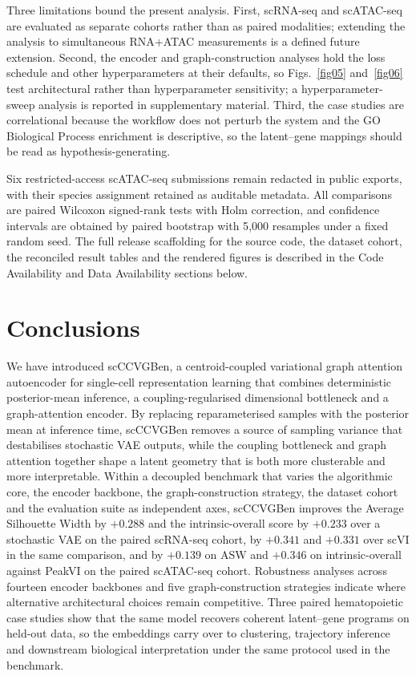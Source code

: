 \documentclass[referee, pdflatex, sn-vancouver-num]{sn-jnl}
\begin{document}
Three limitations bound the present analysis. First, scRNA-seq and scATAC-seq are evaluated as separate cohorts rather than as paired modalities; extending the analysis to simultaneous RNA+ATAC measurements is a defined future extension. Second, the encoder and graph-construction analyses hold the loss schedule and other hyperparameters at their defaults, so Figs.~\ref{fig05} and~\ref{fig06} test architectural rather than hyperparameter sensitivity; a hyperparameter-sweep analysis is reported in supplementary material. Third, the case studies are correlational because the workflow does not perturb the system and the GO Biological Process enrichment is descriptive, so the latent--gene mappings should be read as hypothesis-generating.

Six restricted-access scATAC-seq submissions remain redacted in public exports, with their species assignment retained as auditable metadata. All comparisons are paired Wilcoxon signed-rank tests with Holm correction, and confidence intervals are obtained by paired bootstrap with 5{,}000 resamples under a fixed random seed. The full release scaffolding for the source code, the dataset cohort, the reconciled result tables and the rendered figures is described in the Code Availability and Data Availability sections below.

\section{Conclusions}

We have introduced scCCVGBen, a centroid-coupled variational graph attention autoencoder for single-cell representation learning that combines deterministic posterior-mean inference, a coupling-regularised dimensional bottleneck and a graph-attention encoder. By replacing reparameterised samples with the posterior mean at inference time, scCCVGBen removes a source of sampling variance that destabilises stochastic VAE outputs, while the coupling bottleneck and graph attention together shape a latent geometry that is both more clusterable and more interpretable. Within a decoupled benchmark that varies the algorithmic core, the encoder backbone, the graph-construction strategy, the dataset cohort and the evaluation suite as independent axes, scCCVGBen improves the Average Silhouette Width by $+0.288$ and the intrinsic-overall score by $+0.233$ over a stochastic VAE on the paired scRNA-seq cohort, by $+0.341$ and $+0.331$ over scVI in the same comparison, and by $+0.139$ on ASW and $+0.346$ on intrinsic-overall against PeakVI on the paired scATAC-seq cohort. Robustness analyses across fourteen encoder backbones and five graph-construction strategies indicate where alternative architectural choices remain competitive. Three paired hematopoietic case studies show that the same model recovers coherent latent--gene programs on held-out data, so the embeddings carry over to clustering, trajectory inference and downstream biological interpretation under the same protocol used in the benchmark.
\end{document}
